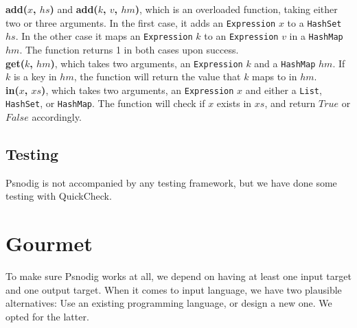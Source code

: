 \textbf{add($x$, $hs$)} and \textbf{add($k$, $v$, $hm$)}, which is an overloaded function, taking either two or three arguments. In the first case, it adds an \texttt{Expression} $x$ to a \texttt{HashSet} $hs$. In the other case it maps an \texttt{Expression} $k$ to an \texttt{Expression} $v$ in a \texttt{HashMap} $hm$. The function returns 1 in both cases upon success. \hfill \\

\textbf{get($k$, $hm$)}, which takes two arguments, an \texttt{Expression} $k$ and a \texttt{HashMap} $hm$. If $k$ is a key in $hm$, the function will return the value that $k$ maps to in $hm$. \hfill \\

\textbf{in($x$, $xs$)}, which takes two arguments, an \texttt{Expression} $x$ and either a \texttt{List}, \texttt{HashSet}, or \texttt{HashMap}. The function will check if $x$ exists in $xs$, and return $True$ or $False$ accordingly.

\subsection{Testing}

Psnodig is not accompanied by any testing framework, but we have done some testing with QuickCheck. \hfill \\




\section{Gourmet}

To make sure Psnodig works at all, we depend on having at least one input target and one output target. When it comes to input language, we have two plausible alternatives: Use an existing programming language, or design a new one. We opted for the latter. \hfill \\

